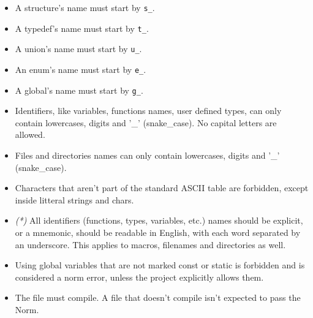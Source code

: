 \documentclass{42-en}
\begin{document}
        \begin{itemize}

            \item A structure's name must start by
                \texttt{s\_}.

            \item A typedef's name must start by
                \texttt{t\_}.

            \item A union's name must start by \texttt{u\_}.

            \item An enum's name must start by \texttt{e\_}.

            \item A global's name must start by \texttt{g\_}.

            \item Identifiers, like variables, functions names, user defined types,
              can only contain lowercases, digits and '\_' (snake\_case). No capital letters are allowed.

            \item Files and directories names can only contain lowercases, digits and
                '\_' (snake\_case).

            \item Characters that aren't part of the standard
                ASCII table are forbidden, except inside litteral strings and chars.

            \item \textit{(*)} All identifiers (functions, types,
              variables, etc.) names should be explicit, or a mnemonic,
              should be readable in English, with each word separated by an underscore.
              This applies to macros, filenames and directories as well.

            \item Using global variables that are not marked const or static is
            forbidden and is considered a norm error, unless the project explicitly allows them.

            \item The file must compile. A file that doesn't compile isn't expected
                to pass the Norm.
        \end{itemize}
\newpage

\end{document}
